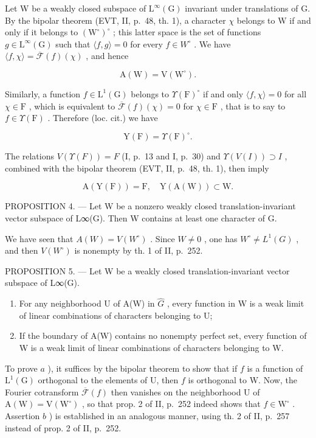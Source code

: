 Let W be a weakly closed subspace of \(\mathrm{L}^{\infty}(\mathrm{G})\) invariant under translations of G. By the bipolar theorem (EVT, II, p.~48, th. 1), a character \(\chi\) belongs to W if and only if it belongs to \((\mathrm{W}^{\circ})^{\circ}\) ; this latter space is the set of functions \(g \in \mathrm{L}^{\infty}(\mathrm{G})\) such that \(\langle f, g \rangle = 0\) for every \(f \in W^{\circ}\) . We have \(\langle f, \chi \rangle = \overline{\mathcal{F}}(f)(\chi)\) , and hence

\[
\mathrm{A} (\mathrm{W}) = \mathrm{V} (\mathrm{W} ^ {\circ}).
\]

Similarly, a function \(f \in \mathrm{L}^1(\mathrm{G})\) belongs to \(\Upsilon(\mathrm{F})^\circ\) if and only \(\langle f, \chi \rangle = 0\) for all \(\chi \in \mathrm{F}\) , which is equivalent to \(\overline{\mathcal{F}}(f)(\chi) = 0\) for \(\chi \in \mathrm{F}\) , that is to say to \(f \in \Upsilon(\mathrm{F})\) . Therefore (loc. cit.) we have

\[
\mathrm{Y} (\mathrm{F}) = \Upsilon (\mathrm{F}) ^ {\circ}.
\]

The relations \(V(\Upsilon(F)) = F\) (I, p.~13 and I, p.~30) and \(\Upsilon(V(I)) \supset I\) , combined with the bipolar theorem (EVT, II, p.~48, th. 1), then imply

\[
\mathrm{A} (\mathrm{Y} (\mathrm{F})) = \mathrm{F}, \quad \mathrm{Y} (\mathrm{A} (\mathrm{W})) \subset \mathrm{W}.
\]

PROPOSITION 4. --- Let W be a nonzero weakly closed translation-invariant vector subspace of L∞(G). Then W contains at least one character of G.

We have seen that \(A(W) = V(W^{\circ})\) . Since \(W \neq 0\) , one has \(W^{\circ} \neq L^{1}(G)\) , and then \(V(W^{\circ})\) is nonempty by th. 1 of II, p.~252.

PROPOSITION 5. --- Let W be a weakly closed translation-invariant vector subspace of L∞(G).

\begin{enumerate}
\def\labelenumi{\alph{enumi})}
\item
  For any neighborhood U of A(W) in \(\widehat{G}\) , every function in W is a weak limit of linear combinations of characters belonging to U;
\item
  If the boundary of A(W) contains no nonempty perfect set, every function of W is a weak limit of linear combinations of characters belonging to W.
\end{enumerate}

To prove \(a\) ), it suffices by the bipolar theorem to show that if \(f\) is a function of \(\mathrm{L}^{1}(\mathrm{G})\) orthogonal to the elements of U, then \(f\) is orthogonal to W. Now, the Fourier cotransform \(\overline{\mathcal{F}}(f)\) then vanishes on the neighborhood U of \(\mathrm{A}(\mathrm{W}) = \mathrm{V}(\mathrm{W}^{\circ})\) , so that prop. 2 of II, p.~252 indeed shows that \(f \in \mathrm{W}^{\circ}\) . Assertion \(b\) ) is established in an analogous manner, using th. 2 of II, p.~257 instead of prop. 2 of II, p.~252.

